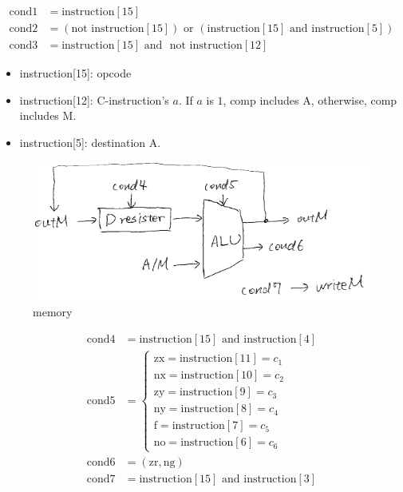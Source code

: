 \documentclass[a4paper]{book}
\begin{document}
\begin{align*}
    \text{cond1} & = \text{instruction}[15] \\
    \text{cond2} & = (\text{not } \text{instruction}[15]) \text{ or } (\text{instruction}[15] \text{ and } \text{instruction}[5]) \\
    \text{cond3} & = \text{instruction}[15] \text{ and } \text{ not } \text{instruction}[12]
\end{align*}

\begin{itemize}
    \item instruction[15]: opcode
    \item instruction[12]: C-instruction's $a$. If $a$ is $1$, comp includes A, otherwise, comp includes M.
    \item instruction[5]: destination A.
\end{itemize}


\begin{figure}[H]
    \centering
    \includegraphics{pic/project05/cpu2.png}
    \caption{memory}
\end{figure}

\begin{align*}
    \text{cond4} & = \text{instruction}[15] \text{ and } \text{instruction}[4] \\
    \text{cond5} & = \begin{cases}
                        \text{zx} = \text{instruction}[11] = c_1 \\
                        \text{nx} = \text{instruction}[10] = c_2 \\
                        \text{zy} = \text{instruction}[9] = c_3 \\
                        \text{ny} = \text{instruction}[8] = c_4 \\
                        \text{f}  = \text{instruction}[7] = c_5 \\
                        \text{no} = \text{instruction}[6] = c_6
                    \end{cases} \\
    \text{cond6} & = (\text{zr}, \text{ng}) \\
    \text{cond7} & = \text{instruction}[15] \text{ and } \text{instruction}[3]
\end{align*}
\end{document}
